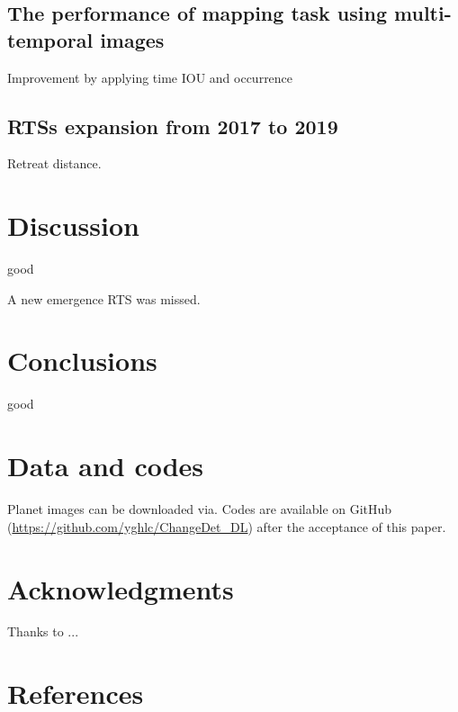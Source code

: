 \documentclass[authoryear,preprint,review,12pt]{elsarticle}
\begin{document}
\subsection{The performance of mapping task using multi-temporal images}
\label{sec_mapping_performance}

Improvement by applying time IOU and occurrence


\subsection{RTSs expansion from 2017 to 2019}
\label{sec_rst_expanding}

Retreat distance. 


\section{Discussion}
\label{sec_discussion}

good

A new emergence RTS was missed. 

\section{Conclusions}
\label{sec_conclusion}

 good

\section{Data and codes}
\label{sec_data_codes}

Planet images can be downloaded via. 
Codes are available on GitHub (\url{https://github.com/yghlc/ChangeDet_DL}) after the acceptance of this paper.

\section{Acknowledgments}
\label{sec_acknowledgments}

Thanks to ...




\section{References}
\label{sec_reference}
\end{document}
